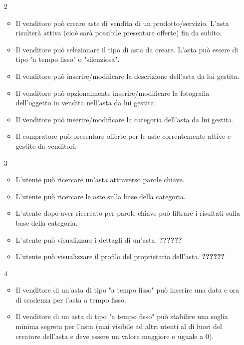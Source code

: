 \begin{itemize}
            \item[2] 
                \begin{itemize}
                    \item Il venditore può creare aste di vendita di un prodotto/servizio. L'asta risulterà attiva (cioè sarà possibile presentare offerte) fin da subito.
                    \item Il venditore può selezionare il tipo di asta da creare. L'asta può essere di tipo "a tempo fisso" o "silenziosa".
                    \item Il venditore può inserire/modificare la descrizione dell'asta da lui gestita.
                    \item Il venditore può opzionalmente inserire/modificare la fotografia dell'oggetto in vendita nell'asta da lui gestita.
                    \item Il venditore può inserire/modificare la categoria dell'asta da lui gestita.
                    \item Il compratore può presentare offerte per le aste correntemente attive e gestite da venditori.
                \end{itemize}
            \item[3]
                \begin{itemize}
                    \item L'utente può ricercare un'asta attraverso parole chiave.
                    \item L'utente può ricercare le aste sulla base della categoria.
                    \item L’utente dopo aver ricercato per parole chiave può filtrare i risultati sulla base della categoria.
                    \item L'utente può visualizzare i dettagli di un'asta. \textbf{??????}
                    \item L'utente può visualizzare il profilo del proprietario dell'asta. \textbf{??????}
                \end{itemize}
            \item[4]
                \begin{itemize}
                    \item Il venditore di un'asta di tipo "a tempo fisso" può inserire una data e ora di scadenza per l'asta a tempo fisso.
                    \item Il venditore di un asta di tipo "a tempo fisso" può stabilire una soglia minima segreta per l'asta (mai visibile ad altri utenti al di fuori del creatore dell'asta e deve essere un valore maggiore o uguale a 0).

\end{itemize}
\end{itemize}

